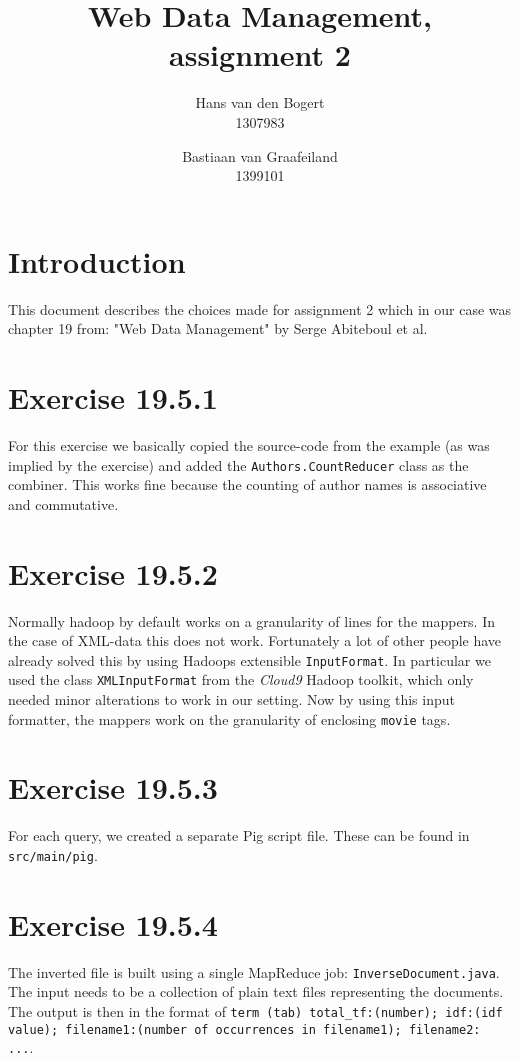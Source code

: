 \documentclass{article}
\title{Web Data Management, assignment 2}
\author{Hans van den Bogert\\1307983 \and Bastiaan van Graafeiland\\1399101}
\begin{document}
\maketitle

\section{Introduction}
This document describes the choices made for assignment 2 which in our
case was chapter 19 from: "Web Data Management" by Serge
Abiteboul et al.

\section{Exercise 19.5.1 }
For this exercise we basically copied the source-code from the example
(as was implied by the exercise) and added the \texttt{Authors.CountReducer}
class as the combiner. This works fine because the counting of author names is associative
and commutative.

\section{Exercise 19.5.2}
Normally hadoop by default works on a granularity of lines for the
mappers. In the case of XML-data this does not work. Fortunately a lot
of other people have already solved this by using Hadoops extensible
\texttt{InputFormat}. In particular we used the class
\texttt{XMLInputFormat} from the \emph{Cloud9} Hadoop toolkit, which
only needed minor alterations to work in our setting. Now by using
this input formatter, the mappers work on the granularity of enclosing
\texttt{movie} tags.

\section{Exercise 19.5.3}
For each query, we created a separate Pig script file. These can be found in \texttt{src/main/pig}.

\section{Exercise 19.5.4}
The inverted file is built using a single MapReduce job:
\texttt{InverseDocument.java}. The input needs to be a collection
of plain text files representing the documents. The output is then in the format of
\texttt{term (tab) total\_tf:(number); idf:(idf value); filename1:(number of occurrences in filename1); filename2: ...}.
\end{document}
